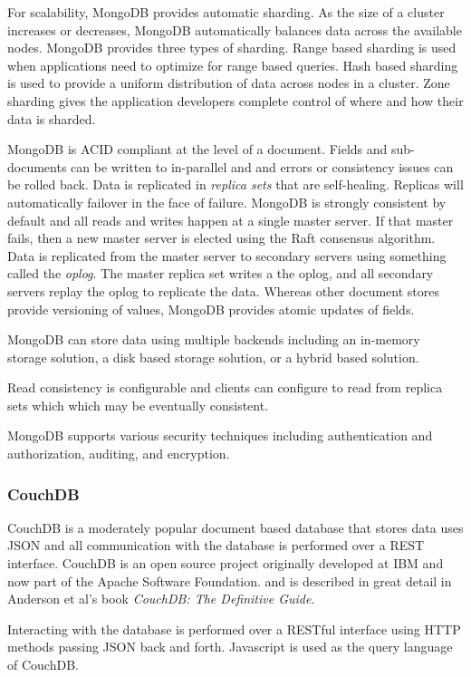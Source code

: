 \documentclass[]{article}
\begin{document}
For scalability, MongoDB provides automatic sharding. As the size of a cluster increases or decreases, MongoDB automatically balances data across the available nodes. MongoDB provides three types of sharding. Range based sharding is used when applications need to optimize for range based queries. Hash based sharding is used to provide a uniform distribution of data across nodes in a cluster. Zone sharding gives the application developers complete control of where and how their data is sharded.

MongoDB is ACID compliant at the level of a document. Fields and sub-documents can be written to in-parallel and and errors or consistency issues can be rolled back. Data is replicated in \textit{replica sets} that are self-healing. Replicas will automatically failover in the face of failure. MongoDB is strongly consistent by default and all reads and writes happen at a single master server. If that master fails, then a new master server is elected using the Raft consensus algorithm.  Data is replicated from the master server to secondary servers using something called the \textit{oplog}. The master replica set writes a the oplog, and all secondary servers replay the oplog to replicate the data. Whereas other document stores provide versioning of values, MongoDB provides atomic updates of fields\cite{cattell_scalable_2011}.

MongoDB can store data using multiple backends including an in-memory storage solution, a disk based storage solution, or a hybrid based solution. 

Read consistency is configurable and clients can configure to read from replica sets which which may be eventually consistent.

MongoDB supports various security techniques including authentication and authorization, auditing, and encryption. 

\subsubsection{CouchDB}\label{sssec:couchdb}
CouchDB is a moderately popular document based database that stores data uses JSON and all communication with the database is performed over a REST interface\cite{sharma_extended_2015}. CouchDB is an open source project originally developed at IBM and now part of the Apache Software Foundation. and is described in great detail in Anderson et al's book \textit{CouchDB: The Definitive Guide}\cite{anderson2010couchdb}.

Interacting with the database is performed over a RESTful interface using HTTP methods passing JSON back and forth. Javascript is used as the query language of CouchDB.
\end{document}
